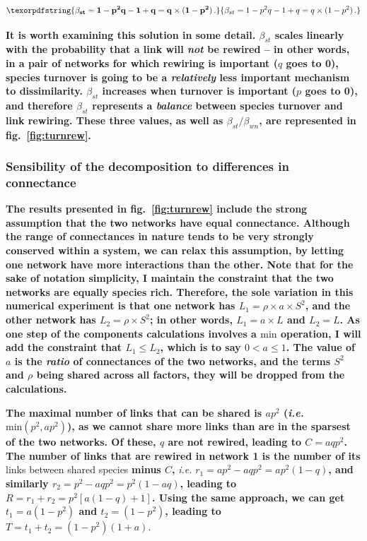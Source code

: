 \documentclass[11pt]{article}
\makeatletter
\def\maxwidth{\ifdim\Gin@nat@width>\linewidth\linewidth
\else\Gin@nat@width\fi}
\let\Oldincludegraphics\includegraphics
\renewcommand{\includegraphics}[1]{\Oldincludegraphics[width=\maxwidth]{#1}}
\providecommand{\DIFaddtex}[1]{{\bf #1}} %
\providecommand{\DIFdeltex}[1]{} %
\providecommand{\DIFaddbegin}{\protect\color{blue}} %
\providecommand{\DIFaddend}{\protect\color{black}} %
\providecommand{\DIFdelbegin}{\protect\color{red}} %
\providecommand{\DIFdelend}{\protect\color{black}} %
\providecommand{\DIFadd}[1]{\texorpdfstring{\DIFaddtex{#1}}{#1}} %
\providecommand{\DIFdel}[1]{\texorpdfstring{\DIFdeltex{#1}}{}} %
\newcommand{\DIFscaledelfig}{0.5}
\newlength{\DIFdelgraphicswidth} %
\newlength{\DIFdelgraphicsheight} %
\newcommand{\DIFaddincludegraphics}[2][]{{\color{blue}\fbox{\DIFOincludegraphics[#1]{#2}}}} %
\newcommand{\DIFdelincludegraphics}[2][]{%
\sbox{\DIFdelgraphicsbox}{\DIFOincludegraphics[#1]{#2}}%
\settoboxwidth{\DIFdelgraphicswidth}{\DIFdelgraphicsbox} %
\settoboxtotalheight{\DIFdelgraphicsheight}{\DIFdelgraphicsbox} %
\scalebox{\DIFscaledelfig}{%
\parbox[b]{\DIFdelgraphicswidth}{\usebox{\DIFdelgraphicsbox}\\[-\baselineskip] \rule{\DIFdelgraphicswidth}{0em}}\llap{\resizebox{\DIFdelgraphicswidth}{\DIFdelgraphicsheight}{%
\setlength{\unitlength}{\DIFdelgraphicswidth}%
\begin{picture}(1,1)%
\thicklines\linethickness{2pt} %
{\color[rgb]{1,0,0}\put(0,0){\framebox(1,1){}}}%
{\color[rgb]{1,0,0}\put(0,0){\line( 1,1){1}}}%
{\color[rgb]{1,0,0}\put(0,1){\line(1,-1){1}}}%
\end{picture}%
}\hspace*{3pt}}} %
} %
\DeclareRobustCommand{\DIFaddbegin}{\DIFOaddbegin \let\includegraphics\DIFaddincludegraphics} %
\DeclareRobustCommand{\DIFaddend}{\DIFOaddend \let\includegraphics\DIFOincludegraphics} %
\DeclareRobustCommand{\DIFdelbegin}{\DIFOdelbegin \let\includegraphics\DIFdelincludegraphics} %
\DeclareRobustCommand{\DIFdelend}{\DIFOaddend \let\includegraphics\DIFOincludegraphics} %
\makeatother
\begin{document}
\[\DIFadd{\beta_{st} = 1 - p^2q - 1 + q = q\times(1-p^2)\,.}\]

\DIFadd{It is worth examining this solution in some detail. \(\beta_{st}\)
scales linearly with the probability that a link will \emph{not} be
rewired -- in other words, in a pair of networks for which rewiring is
important (\(q\) goes to 0), species turnover is going to be a
\emph{relatively} less important mechanism to dissimilarity.
\(\beta_{st}\) increases when turnover is important (\(p\) goes to 0),
and therefore \(\beta_{st}\) represents a \emph{balance} between species
turnover and link rewiring. These three values, as well as
\(\beta_{st}/\beta_{wn}\), are represented in fig.~\ref{fig:turnrew}.
}

\hypertarget{sensibility-of-the-decomposition-to-differences-in-connectance}{%
\subsubsection{Sensibility of the decomposition to differences in
connectance}\label{sensibility-of-the-decomposition-to-differences-in-connectance}}

\DIFadd{The results presented in fig.~\ref{fig:turnrew} include the strong
assumption that the two networks have equal connectance. Although the
range of connectances in nature tends to be very strongly conserved
within a system, we can relax this assumption, by letting one network
have more interactions than the other. Note that for the sake of
notation simplicity, I maintain the constraint that the two networks are
equally species rich. Therefore, the sole variation in this numerical
experiment is that one network has \(L_1 = \rho\times a\times S^2\), and
the other network has \(L_2 = \rho\times S^2\); in other words,
\(L_1 = a\times L\) and \(L_2 = L\). As one step of the components
calculations involves a \(\text{min}\) operation, I will add the
constraint that \(L_1 \le L_2\), which is to say \(0 < a \le 1\). The
value of \(a\) is the \emph{ratio} of connectances of the two networks,
and the terms \(S^2\) and \(\rho\) being shared across all factors, they
will be dropped from the calculations.
}

\DIFadd{The maximal number of links that can be shared is \(ap^2\) (\emph{i.e.}
\(\text{min}(p^2, ap^2)\)), as we cannot share more links than are in
the sparsest of the two networks. Of these, \(q\) are not rewired,
leading to \(C = aqp^2\). The number of links that are rewired in
network 1 is the number of its }\DIFaddend links between shared species \DIFdelbegin \DIFdel{). Althought the \emph{raw} values of \(\beta_{st}\) may seem low, the normalization using
\(\beta_{st}/\beta_{wn}\) magnifies this effect: its values are indeed
maximized when the rewiring is lower, }\DIFdelend \DIFaddbegin \DIFadd{minus \(C\),
}\DIFaddend \emph{i.e.} \DIFdelbegin \DIFdel{all of the network
variation stems from turnover processes}\DIFdelend \DIFaddbegin \DIFadd{\(r_1 = ap^2 - aqp^2 = ap^2(1-q)\), and similarly
\(r_2 = p^2 - aqp^2 = p^2(1-aq)\), leading to
\(R = r_1 + r_2 = p^2 \left[a(1-q)+1\right]\). Using the same approach,
we can get \(t_1 = a(1-p^2)\) and \(t_2 = (1-p^2)\), leading to
\(T = t_1 + t_2 = (1-p^2)(1+a)\)}\DIFaddend .
\end{document}
